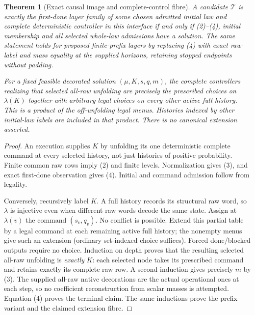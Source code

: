 \documentclass[11pt]{article}
\newtheorem{theorem}{Theorem}\newtheorem{proposition}{Proposition}
\begin{document}
\begin{theorem}[Exact causal image and complete-control fibre]
A candidate $\mathcal T$ is exactly the first-done layer family of some chosen admitted initial law and complete deterministic controller in this interface if and only if (2)--(4), initial membership and all selected whole-law admissions have a solution. The same statement holds for proposed finite-prefix layers by replacing (4) with exact raw-label and mass equality at the supplied horizons, retaining stopped endpoints without padding.

For a fixed feasible decorated solution $(\mu,K,s,q,m)$, the complete controllers realizing that selected all-raw unfolding are precisely the prescribed choices on $\lambda(K)$ together with arbitrary legal choices on every other active full history. This is a product of the off-unfolding legal menus. Histories indexed by other initial-law labels are included in that product. There is no canonical extension asserted.
\end{theorem}
\begin{proof}
An execution supplies $K$ by unfolding its one deterministic complete command at every selected history, not just histories of positive probability. Finite common raw rows imply (2) and finite levels. Normalization gives (3), and exact first-done observation gives (4). Initial and command admission follow from legality.

Conversely, recursively label $K$. A full history records its structural raw word, so $\lambda$ is injective even when different raw words decode the same state. Assign at $\lambda(v)$ the command $(s_v,q_v)$. No conflict is possible. Extend this partial table by a legal command at each remaining active full history; the nonempty menus give such an extension (ordinary set-indexed choice suffices). Forced done/blocked outputs require no choice. Induction on depth proves that the resulting selected all-raw unfolding is \emph{exactly} $K$: each selected node takes its prescribed command and retains exactly its complete raw row. A second induction gives precisely $m$ by (3). The supplied all-raw native decorations are the actual operational ones at each step, so no coefficient reconstruction from scalar masses is attempted. Equation (4) proves the terminal claim. The same inductions prove the prefix variant and the claimed extension fibre.
\end{proof}
\end{document}
